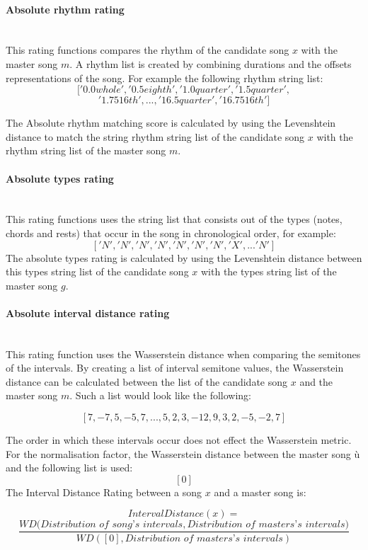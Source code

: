 
\paragraph{Absolute rhythm rating}\mbox{}\\
This rating functions compares the rhythm of the candidate song $x$ with the master song $m$. A rhythm list is created by combining durations and the offsets representations of the song. For example the following rhythm string list:
\[ ['0.0whole', '0.5eighth', '1.0quarter', '1.5quarter',\]
\[ '1.7516th', ... , '16.5quarter', '16.7516th']\]

The Absolute rhythm matching score is calculated by using the Levenshtein distance to match the string rhythm string list of the candidate song $x$ with the rhythm string list of the master song $m$. 

\paragraph{Absolute types rating}\mbox{}\\
This rating functions uses the string list that consists out of the types (notes, chords and rests) that occur in the song in chronological order, for example:
 \[['N', 'N', 'N', 'N', 'N', 'N',  'N', 'X', ... 'N'] \]
The absolute types rating is calculated by using the Levenshtein distance between this types string list of the candidate song $x$ with the types string list of the master song $g$.

\paragraph{Absolute interval distance rating}\mbox{}\\
This rating function uses the Wasserstein distance when comparing the semitones of the intervals. By creating a list of interval semitone values, the Wasserstein distance can be calculated between the list of the candidate song  $x$ and the master song $m$. Such a list would look like the following:

 \[ [7, -7, 5, -5, 7 , ..., 5, 2, 3, -12, 9, 3, 2, -5, -2, 7]\]

 The order in which these intervals occur does not effect the Wasserstein metric. For the normalisation factor, the Wasserstein distance between the master song $ù$ and the following list is used:
  \[ [0]\]
 The Interval Distance Rating between a song $x$ and a master song is:
  
\[ IntervalDistance(x) = \]
\[ \frac{WD(\textit{Distribution of song's intervals},\textit{{Distribution of masters's intervals})}} {WD([0],\textit{Distribution of masters's intervals})} \]


